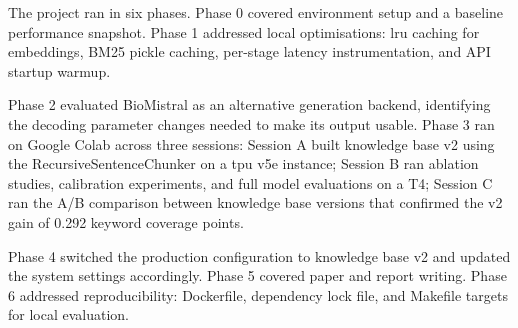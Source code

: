 The project ran in six phases. Phase 0 covered environment setup and a baseline performance snapshot. Phase 1 addressed local optimisations: \ac{lru} caching for embeddings, BM25 pickle caching, per-stage latency instrumentation, and API startup warmup.

Phase 2 evaluated BioMistral as an alternative generation backend, identifying the decoding parameter changes needed to make its output usable. Phase 3 ran on Google Colab across three sessions: Session A built knowledge base v2 using the RecursiveSentenceChunker on a \ac{tpu} v5e instance; Session B ran ablation studies, calibration experiments, and full model evaluations on a T4; Session C ran the A/B comparison between knowledge base versions that confirmed the v2 gain of 0.292 keyword coverage points.

Phase 4 switched the production configuration to knowledge base v2 and updated the system settings accordingly. Phase 5 covered paper and report writing. Phase 6 addressed reproducibility: Dockerfile, dependency lock file, and Makefile targets for local evaluation.
